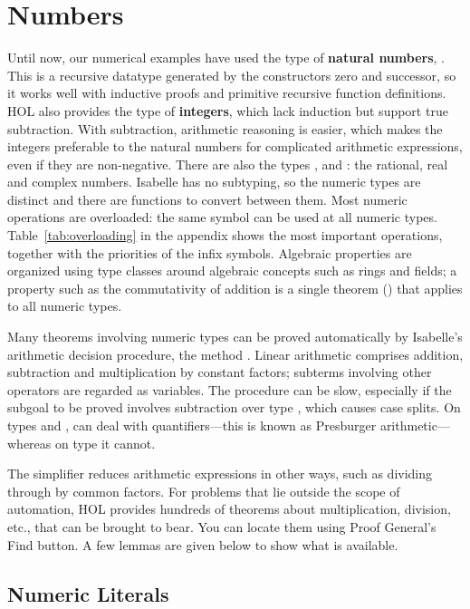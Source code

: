 \section{Numbers}
\label{sec:numbers}

%
Until now, our numerical examples have used the type of \textbf{natural
numbers},
.  This is a recursive datatype generated by the constructors
zero  and successor, so it works well with inductive proofs and primitive
recursive function definitions.  HOL also provides the type
 of \textbf{integers}, which lack induction but support true
subtraction.  With subtraction, arithmetic reasoning is easier, which makes
the integers preferable to the natural numbers for
complicated arithmetic expressions, even if they are non-negative.  There are also the types
,  and : the rational, real and complex numbers.  Isabelle has no
subtyping,  so the numeric
types are distinct and there are functions to convert between them.
Most numeric operations are overloaded: the same symbol can be
used at all numeric types. Table~\ref{tab:overloading} in the appendix
shows the most important operations, together with the priorities of the
infix symbols. Algebraic properties are organized using type classes
around algebraic concepts such as rings and fields;
a property such as the commutativity of addition is a single theorem
() that applies to all numeric types.

%
Many theorems involving numeric types can be proved automatically by
Isabelle's arithmetic decision procedure, the method
.  Linear arithmetic comprises addition, subtraction
and multiplication by constant factors; subterms involving other operators
are regarded as variables.  The procedure can be slow, especially if the
subgoal to be proved involves subtraction over type , which
causes case splits.  On types  and , 
can deal with quantifiers---this is known as Presburger arithmetic---whereas on type  it cannot.

The simplifier reduces arithmetic expressions in other
ways, such as dividing through by common factors.  For problems that lie
outside the scope of automation, HOL provides hundreds of
theorems about multiplication, division, etc., that can be brought to
bear.  You can locate them using Proof General's Find
button.  A few lemmas are given below to show what
is available.

\subsection{Numeric Literals}
\label{sec:numerals}

